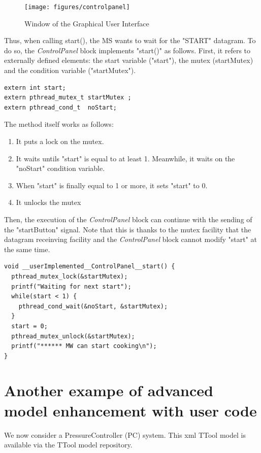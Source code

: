 \documentclass[12pt]{article}
\begin{document}
\begin{figure}[htbp]
\centering
\texttt{[image: figures/controlpanel]}
\caption{Window of the Graphical User Interface} \label{fig:controlpanel}
\end{figure}

Thus, when calling start(), the MS wants to wait for the "START" datagram. To do so, the \textit{ControlPanel} block implements "start()" as follows. First, it refers to externally defined elements: the start variable ("start"), the mutex (startMutex) and the condition variable ("startMutex").
\begin{lstlisting}
extern int start;
extern pthread_mutex_t startMutex ;
extern pthread_cond_t  noStart;
\end{lstlisting}
The method itself works as follows:
\begin{enumerate}
\item It puts a lock on the mutex.
\item It waits untils "start" is equal to at least 1. Meanwhile, it waits on the "noStart" condition variable.
\item When "start" is finally equal to 1 or more, it sets "start" to 0.
\item It unlocks the mutex
\end{enumerate}

Then, the execution of the \textit{ControlPanel} block can continue with the sending of the "startButton" signal. Note that  this is thanks to the mutex facility that the datagram receinving facility and the \textit{ControlPanel} block cannot modify "start" at the same time.\\

\begin{lstlisting}
void __userImplemented__ControlPanel__start() {
  pthread_mutex_lock(&startMutex);
  printf("Waiting for next start");
  while(start < 1) {
    pthread_cond_wait(&noStart, &startMutex);
  }
  start = 0;
  pthread_mutex_unlock(&startMutex);
  printf("****** MW can start cooking\n");
}
\end{lstlisting}

\newpage
\section{Another exampe of advanced model enhancement with user code}\label{sec:otheradvanced}
We now consider a PressureController (PC) system. This xml TTool model is available via the TTool model repository.
\end{document}
